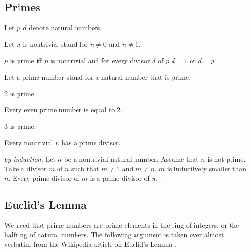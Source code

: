 \documentclass[11pt]{article}
\begin{document}
\subsection{Primes}

\begin{forthel}

Let $p,d$ denote natural numbers.

Let $n$ is nontrivial stand for $n \neq 0$ and $n \neq 1$.

\begin{definition}
$p$ is prime iff $p$ is nontrivial and
for every divisor $d$ of $p$ $d = 1$ or $d = p$.
\end{definition}
Let a prime number stand for a natural number that is prime.

\begin{lemma} $2$ is prime.
\end{lemma}

\begin{lemma}
Every even prime number is equal to $2$.
\end{lemma}

\begin{lemma} $3$ is prime.
\end{lemma}

\begin{lemma}
Every nontrivial $n$ has a prime divisor.
\end{lemma}
\begin{proof}[by induction]
Let $n$ be a nontrivial natural number.
Assume that $n$ is not prime.
Take a divisor $m$ of $n$ such that $m \neq 1$ and $m \neq n$.
$m$ is inductively smaller than $n$.
Every prime divisor of $m$ is a prime divisor of $n$.
\end{proof}
\end{forthel}

\subsection{Euclid's Lemma}

We need that prime numbers are prime 
elements in the ring of integers, or the halfring of natural numbers.
The following argument is taken over almost verbatim from 
the Wikipedia article on Euclid's Lemma
\cite{Wikipedia_EuclidsLemma}.
\end{document}

